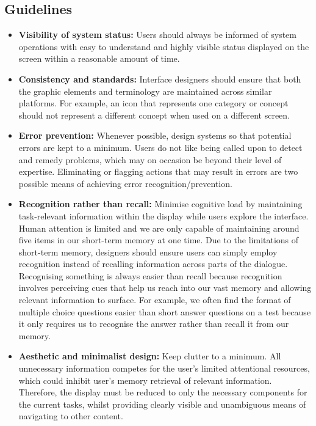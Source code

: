 \subsection{Guidelines}
\begin{itemize}
\item \textbf{Visibility of system status:} Users should always be informed of system operations with easy to understand and highly visible status displayed on the screen within a reasonable amount of time.

\item \textbf{Consistency and standards:} Interface designers should ensure that both the graphic elements and terminology are maintained across similar platforms. For example, an icon that represents one category or concept should not represent a different concept when used on a different screen.

\item \textbf{Error prevention:} Whenever possible, design systems so that potential errors are kept to a minimum. Users do not like being called upon to detect and remedy problems, which may on occasion be beyond their level of expertise. Eliminating or flagging actions that may result in errors are two possible means of achieving error recognition/prevention.

\item \textbf{Recognition rather than recall:} Minimise cognitive load by maintaining task-relevant information within the display while users explore the interface. Human attention is limited and we are only capable of maintaining around five items in our short-term memory at one time. Due to the limitations of short-term memory, designers should ensure users can simply employ recognition instead of recalling information across parts of the dialogue. Recognising something is always easier than recall because recognition involves perceiving cues that help us reach into our vast memory and allowing relevant information to surface. For example, we often find the format of multiple choice questions easier than short answer questions on a test because it only requires us to recognise the answer rather than recall it from our memory.

\item \textbf{Aesthetic and minimalist design:} Keep clutter to a minimum. All unnecessary information competes for the user's limited attentional resources, which could inhibit user's memory retrieval of relevant information. Therefore, the display must be reduced to only the necessary components for the current tasks, whilst providing clearly visible and unambiguous means of navigating to other content.

\end{itemize}

